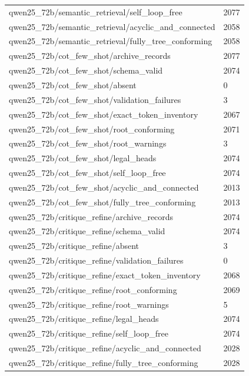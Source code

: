 \begin{tabular}{ll}
qwen25\_72b/semantic\_retrieval/self\_loop\_free & 2077 \\
qwen25\_72b/semantic\_retrieval/acyclic\_and\_connected & 2058 \\
qwen25\_72b/semantic\_retrieval/fully\_tree\_conforming & 2058 \\
qwen25\_72b/cot\_few\_shot/archive\_records & 2077 \\
qwen25\_72b/cot\_few\_shot/schema\_valid & 2074 \\
qwen25\_72b/cot\_few\_shot/absent & 0 \\
qwen25\_72b/cot\_few\_shot/validation\_failures & 3 \\
qwen25\_72b/cot\_few\_shot/exact\_token\_inventory & 2067 \\
qwen25\_72b/cot\_few\_shot/root\_conforming & 2071 \\
qwen25\_72b/cot\_few\_shot/root\_warnings & 3 \\
qwen25\_72b/cot\_few\_shot/legal\_heads & 2074 \\
qwen25\_72b/cot\_few\_shot/self\_loop\_free & 2074 \\
qwen25\_72b/cot\_few\_shot/acyclic\_and\_connected & 2013 \\
qwen25\_72b/cot\_few\_shot/fully\_tree\_conforming & 2013 \\
qwen25\_72b/critique\_refine/archive\_records & 2074 \\
qwen25\_72b/critique\_refine/schema\_valid & 2074 \\
qwen25\_72b/critique\_refine/absent & 3 \\
qwen25\_72b/critique\_refine/validation\_failures & 0 \\
qwen25\_72b/critique\_refine/exact\_token\_inventory & 2068 \\
qwen25\_72b/critique\_refine/root\_conforming & 2069 \\
qwen25\_72b/critique\_refine/root\_warnings & 5 \\
qwen25\_72b/critique\_refine/legal\_heads & 2074 \\
qwen25\_72b/critique\_refine/self\_loop\_free & 2074 \\
qwen25\_72b/critique\_refine/acyclic\_and\_connected & 2028 \\
qwen25\_72b/critique\_refine/fully\_tree\_conforming & 2028 \\
\hline
\end{tabular}
